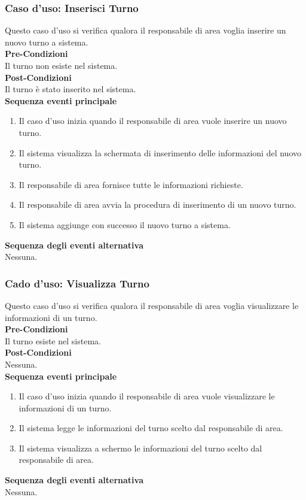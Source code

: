 \documentclass[green, fancy, 11pt]{elegantbook}
\begin{document}
\subsubsection{Caso d'uso: Inserisci Turno}
\noindent
Questo caso d’uso si verifica qualora il responsabile di area voglia inserire un nuovo turno a sistema.\\
\textbf{Pre-Condizioni}\\
Il turno non esiste nel sistema.\\
\textbf{Post-Condizioni}\\
Il turno è stato inserito nel sistema.\\
\textbf{Sequenza eventi principale}
\begin{enumerate}
	\item Il caso d’uso inizia quando il responsabile di area vuole inserire un nuovo turno.
    \item Il sistema visualizza la schermata di inserimento delle informazioni del nuovo turno.
	\item Il responsabile di area fornisce tutte le informazioni richieste.
	\item Il responsabile di area avvia la procedura di inserimento di un nuovo turno.
	\item Il sistema aggiunge con successo il nuovo turno a sistema.
\end{enumerate}
\textbf{Sequenza degli eventi alternativa}\\
Nessuna.
\newpage

\subsubsection{Cado d'uso: Visualizza Turno}
\noindent
Questo caso d’uso si verifica qualora il responsabile di area voglia visualizzare le informazioni di un turno.\\
\textbf{Pre-Condizioni}\\
Il turno esiste nel sistema.\\
\textbf{Post-Condizioni}\\
Nessuna.\\
\textbf{Sequenza eventi principale}
\begin{enumerate}
	\item Il caso d’uso inizia quando il responsabile di area vuole visualizzare le informazioni di un turno.
	\item Il sistema legge le informazioni del turno scelto dal responsabile di area.
	\item Il sistema visualizza a schermo le informazioni del turno scelto dal responsabile di area.
\end{enumerate}
\textbf{Sequenza degli eventi alternativa}\\
Nessuna.
\end{document}
